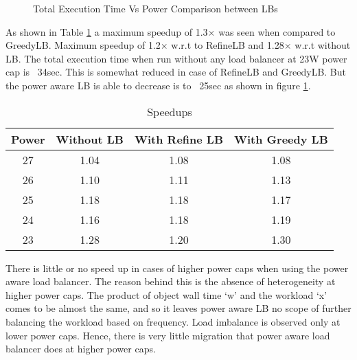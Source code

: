 \begin{figure}
\centering
\caption{Total Execution Time Vs Power Comparison between LBs} 
\label{fig:final_exec_time_vs_power}
\end{figure}
%
As shown in Table \ref{tb:1} a maximum speedup of 1.3$\times$ was seen when compared
to GreedyLB. Maximum speedup of 1.2$\times$ w.r.t to RefineLB and 1.28$\times$ w.r.t without LB.
The total execution time when run without any load balancer at 23W power cap is
~34sec.  This is somewhat reduced in case of RefineLB and GreedyLB. But the
power aware LB is able to decrease is to ~25sec as shown in figure \ref{fig:final_exec_time_vs_power}. 

\begin{table}[h]
\begin{tabular}{|c|c|c|c|}
\hline
Power & Without LB & With Refine LB & With Greedy LB \\ \hline
27 & 1.04 & 1.08 & 1.08 \\ \hline
26 & 1.10 & 1.11 & 1.13 \\ \hline
25 & 1.18 & 1.18 & 1.17 \\ \hline
24 & 1.16 & 1.18 & 1.19 \\ \hline
23 & 1.28 & 1.20 & 1.30 \\ \hline
\end{tabular}
\caption{Speedups}
\label{tb:1}
\end{table}

There is little or no speed up in cases of higher power caps when using the
power aware load balancer. The reason behind this is the absence of
heterogeneity at higher power caps. The product of object wall time ‘w’ and the
workload ‘x’ comes to be almost the same, and so it leaves power aware LB no
scope of further balancing the workload based on frequency. Load imbalance is
observed only at lower power caps. Hence, there is very little migration that
power aware load balancer does at higher power caps. 

